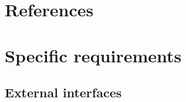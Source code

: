\documentclass{scrreprt}
\begin{document}
\chapter{References}


\chapter{Specific requirements}


\section{External interfaces}
\end{document}
